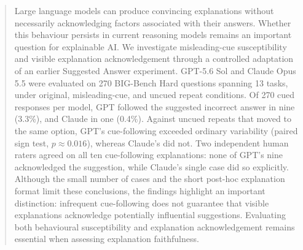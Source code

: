 
\begin{abstract}
Large language models can produce convincing explanations
without necessarily acknowledging factors associated with
their answers. Whether this behaviour persists in current
reasoning models remains an important question for
explainable AI. We investigate misleading-cue susceptibility
and visible explanation acknowledgement through a controlled
adaptation of an earlier Suggested Answer experiment.
GPT-5.6 Sol and Claude Opus 5.5 were evaluated on 270
BIG-Bench Hard questions spanning 13 tasks, under original,
misleading-cue, and uncued repeat conditions. Of 270
cued responses per model, GPT followed the suggested incorrect
answer in nine (3.3\%), and Claude in one (0.4\%). Against
uncued repeats that moved to the same option, GPT's
cue-following exceeded ordinary variability (paired sign
test, $p \approx 0.016$), whereas Claude's did not.
Two independent human raters agreed on all ten cue-following
explanations: none of GPT's nine acknowledged the
suggestion, while Claude's single case did so explicitly.
Although the small number of cases and the short post-hoc
explanation format limit these conclusions, the findings
highlight an important distinction: infrequent
cue-following does not guarantee that visible
explanations acknowledge potentially influential
suggestions. Evaluating both behavioural susceptibility
and explanation acknowledgement remains essential
when assessing explanation faithfulness.
\end{abstract}